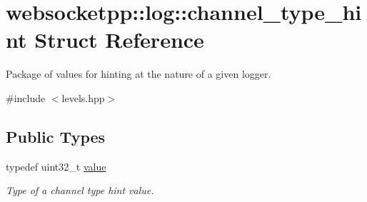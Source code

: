 \hypertarget{structwebsocketpp_1_1log_1_1channel__type__hint}{}\section{websocketpp\+:\+:log\+:\+:channel\+\_\+type\+\_\+hint Struct Reference}
\label{structwebsocketpp_1_1log_1_1channel__type__hint}


Package of values for hinting at the nature of a given logger.  




{\ttfamily \#include $<$levels.\+hpp$>$}

\subsection*{Public Types}
\begin{DoxyCompactItemize}
\item 
typedef uint32\+\_\+t \hyperlink{structwebsocketpp_1_1log_1_1channel__type__hint_ad12a7f6555b71aabdc4cbec604dc89dd}{value}\hypertarget{structwebsocketpp_1_1log_1_1channel__type__hint_ad12a7f6555b71aabdc4cbec604dc89dd}{}\label{structwebsocketpp_1_1log_1_1channel__type__hint_ad12a7f6555b71aabdc4cbec604dc89dd}

\begin{DoxyCompactList}\small\item\em Type of a channel type hint value. \end{DoxyCompactList}\end{DoxyCompactItemize}

